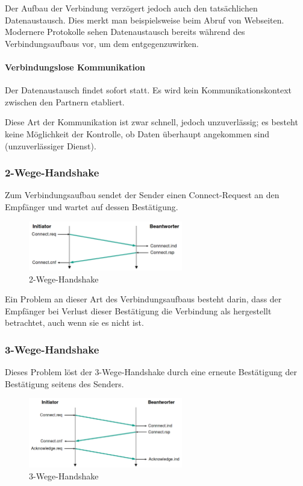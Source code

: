 \documentclass[a4paper, 14pt]{article}
\begin{document}
	Der Aufbau der Verbindung verzögert jedoch auch den tatsächlichen Datenaustausch.
	Dies merkt man beispielsweise beim Abruf von Webseiten.
	Modernere Protokolle sehen Datenaustausch bereits während des Verbindungsaufbaus vor, um dem entgegenzuwirken.

	\paragraph{Verbindungslose Kommunikation}

	Der Datenaustausch findet sofort statt.
	Es wird kein Kommunikationskontext zwischen den Partnern etabliert.

	Diese Art der Kommunikation ist zwar schnell, jedoch unzuverlässig; es besteht keine Möglichkeit der Kontrolle, ob Daten überhaupt angekommen sind (unzuverlässiger Dienst).

	\subsubsection{2-Wege-Handshake}

	Zum Verbindungsaufbau sendet der Sender einen Connect-Request an den Empfänger und wartet auf dessen Bestätigung.

	\begin{figure}
		\begin{center}
			\includegraphics[width=0.6\textwidth]{images/04-2-way-handshake.png}
		\end{center}
		\caption{2-Wege-Handshake}
	\end{figure}

	Ein Problem an dieser Art des Verbindungsaufbaus besteht darin, dass der Empfänger bei Verlust dieser Bestätigung die Verbindung als hergestellt betrachtet, auch wenn sie es nicht ist.

	\subsubsection{3-Wege-Handshake}

	Dieses Problem löst der 3-Wege-Handshake durch eine erneute Bestätigung der Bestätigung seitens des Senders.

	\begin{figure}
		\begin{center}
			\includegraphics[width=0.6\textwidth]{images/04-3-way-handshake.png}
		\end{center}
		\caption{3-Wege-Handshake}
	\end{figure}
\end{document}
